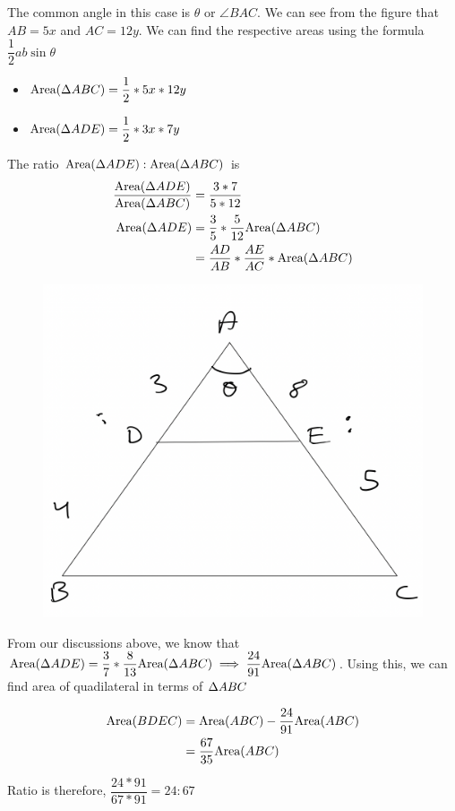 The common angle in this case is $\theta$ or $\angle{BAC}$. We can see from the figure that $AB = 5x$ and $AC = 12y$. We can find the respective areas using the formula $\dfrac{1}{2} ab \sin{\theta}$

\begin{itemize}
    \item $\text{Area}({\Delta {ABC}}) = \dfrac{1}{2} * 5x * 12y$
    \item $\text{Area}({\Delta {ADE}}) = \dfrac{1}{2} * 3x * 7y$
\end{itemize}

The ratio $\text{Area}({\Delta {ADE}}):\text{Area}({\Delta {ABC}}) $ is
\begin{align*}
    \dfrac{\text{Area}({\Delta {ADE}})}{\text{Area}({\Delta {ABC}})} &= \dfrac{3 * 7}{5 * 12} \\
    \text{Area}({\Delta {ADE}}) &= \dfrac{3}{5} * \dfrac{5}{12} \text{Area}({\Delta {ABC}}) \\
    &= \dfrac{AD}{AB} * \dfrac{AE}{AC} * \text{Area}({\Delta {ABC}}) \\
\end{align*}


\begin{figure}[h!]
    \centering
    \includegraphics[width=0.3\linewidth]{Quant//Geometry//Images//Triangles/triangle_11_question_1_area.png}
\end{figure}

From our discussions above, we know that $\text{Area}({\Delta {ADE}}) = \dfrac{3}{7} * \dfrac{8}{13} \text{Area}({\Delta {ABC}}) \implies \dfrac{24}{91} \text{Area}({\Delta {ABC}})$. Using this, we can find area of quadilateral in terms of $\Delta {ABC}$

\begin{align*}
    \text{Area}({BDEC}) &= \text{Area}({ABC}) - \dfrac{24}{91} \text{Area}({ABC}) \\
    &= \dfrac{67}{35} \text{Area}({ABC})
\end{align*}

Ratio is therefore, $\dfrac{24 * 91}{67 * 91} = 24:67$



